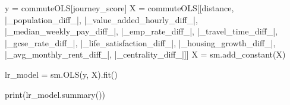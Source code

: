 \documentclass[
  number]{elsarticle}
\newenvironment{Shaded}{\begin{snugshade}}{\end{snugshade}}
\newcommand{\BuiltInTok}[1]{\textcolor[rgb]{0.00,0.23,0.31}{#1}}
\newcommand{\NormalTok}[1]{\textcolor[rgb]{0.00,0.23,0.31}{#1}}
\newcommand{\OperatorTok}[1]{\textcolor[rgb]{0.37,0.37,0.37}{#1}}
\newcommand{\StringTok}[1]{\textcolor[rgb]{0.13,0.47,0.30}{#1}}
\begin{document}
\begin{Shaded}
\begin{Highlighting}[]
\NormalTok{y }\OperatorTok{=}\NormalTok{ commuteOLS[}\StringTok{\textquotesingle{}journey\_score\textquotesingle{}}\NormalTok{]}
\NormalTok{X }\OperatorTok{=}\NormalTok{ commuteOLS[[}\StringTok{\textquotesingle{}distance\textquotesingle{}}\NormalTok{, }\StringTok{\textquotesingle{}|\_population\_diff\_|\textquotesingle{}}\NormalTok{, }\StringTok{\textquotesingle{}|\_value\_added\_hourly\_diff\_|\textquotesingle{}}\NormalTok{,}
                \StringTok{\textquotesingle{}|\_median\_weekly\_pay\_diff\_|\textquotesingle{}}\NormalTok{, }\StringTok{\textquotesingle{}|\_emp\_rate\_diff\_|\textquotesingle{}}\NormalTok{,}
                \StringTok{\textquotesingle{}|\_travel\_time\_diff\_|\textquotesingle{}}\NormalTok{, }\StringTok{\textquotesingle{}|\_gcse\_rate\_diff\_|\textquotesingle{}}\NormalTok{,}
                \StringTok{\textquotesingle{}|\_life\_satisfaction\_diff\_|\textquotesingle{}}\NormalTok{, }\StringTok{\textquotesingle{}|\_housing\_growth\_diff\_|\textquotesingle{}}\NormalTok{,}
                \StringTok{\textquotesingle{}|\_avg\_monthly\_rent\_diff\_|\textquotesingle{}}\NormalTok{, }\StringTok{\textquotesingle{}|\_centrality\_diff\_|\textquotesingle{}}\NormalTok{]]}
\NormalTok{X }\OperatorTok{=}\NormalTok{ sm.add\_constant(X)}

\NormalTok{lr\_model }\OperatorTok{=}\NormalTok{ sm.OLS(y, X).fit()}

\BuiltInTok{print}\NormalTok{(lr\_model.summary())}
\end{Highlighting}
\end{Shaded}
\end{document}
